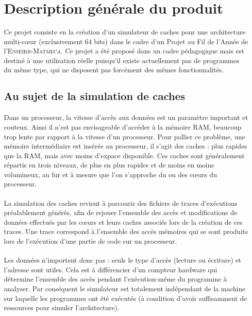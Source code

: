 \section{Description générale du produit}

\paragraph{}
Ce projet consiste en la création d'un simulateur de caches pour une architecture multi-c\oe ur (exclusivement $64$ bits) dans le cadre d'un Projet au Fil de l'Année de l'\textsc{Enseirb-Matmeca}. Ce projet a été proposé dans un cadre pédagogique mais est destiné à une utilisation réelle puisqu'il existe actuellement pas de programmes du même type, qui ne disposent pas forcément des mêmes fonctionnalités.

\subsection{Au sujet de la simulation de caches}

\paragraph{}
Dans un processeur, la vitesse d'accès aux données est un paramètre important et couteux. Ainsi il n'est pas envisageable d'accéder à la mémoire RAM, beaucoup trop lente par rapport à la vitesse d'un processeur. Pour pallier ce problème, une mémoire intermédiaire est insérée au processeur, il s'agit des caches : plus rapides que la RAM, mais avec moins d'expace disponible. Ces caches sont généralement répartis en trois niveaux, de plus en plus rapides et de moins en moins volumineux, au fur et à mesure que l'on s'approche du ou des c\oe urs du processeur.

\paragraph{}
La simulation des caches revient à parcourir des fichiers de traces d'exécutions préalablement générés, afin de rejouer l'ensemble des accès et modifications de données effectués par les c\oe urs et leurs caches associés lors de la création de ces traces. Une trace correspond à l'ensemble des accès mémoires qui se sont produits lors de l'exécution d'une partie de code sur un processeur. 

\paragraph{}
Les données n'importent donc pas : seuls le type d'accès (lecture ou écriture) et l'adresse sont utiles. Cela est à différencier d'un compteur hardware qui détermine l'ensemble des accès pendant l'exécution-même du programme à analyser. Par conséquent le simulateur est totalement indépendant de la machine sur laquelle les programmes ont été exécutés (à condition d'avoir suffisamment de ressources pour simuler l'architecture).   

